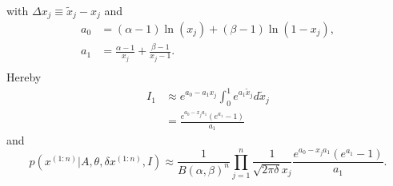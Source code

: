\begin{example}
\begin{equation}
\begin{split}
		\end{split}
	\end{equation}
	with $\Delta x_j \equiv \tilde{x}_j-x_j$ and
	\begin{equation}
		\begin{split}
			a_0 & = (\alpha-1)\ln(x_j)+(\beta-1)\ln(1-x_j),\\
			a_1 & = \frac{\alpha-1}{x_j}+\frac{\beta-1}{x_j-1}.\\
		\end{split}
	\end{equation}
	Hereby
	\begin{equation}
		\begin{split}
			I_1 &\approx e^{a_0-a_1x_j}\int_0^1e^{a_1\tilde{x}_j}d\tilde{x}_j\\
			&= \frac{e^{a_0-x_j a_1}(e^{a_1}-1)}{a_1}
		\end{split}
	\end{equation}
	and
	\begin{equation}
		p(x^{(1:n)}|A,\theta,\delta x^{(1:n)}, I) \approx\frac{1}{B(\alpha,\beta)^n}\prod_{j=1}^{n}\frac{1}{\sqrt{2\pi \delta} x_j}\frac{e^{a_0-x_j a_1}(e^{a_1}-1)}{a_1}.
		\label{likelihood3}
	\end{equation}
\end{example}